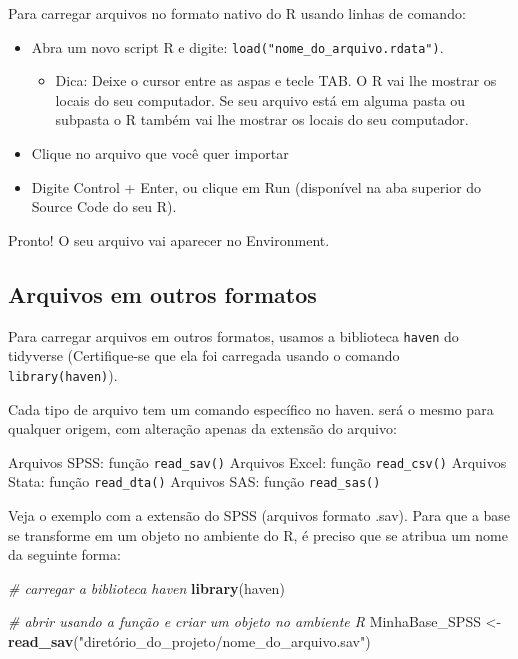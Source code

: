 \documentclass[
  brazil,
]{book}
\newenvironment{Shaded}{\begin{snugshade}}{\end{snugshade}}
\newcommand{\CommentTok}[1]{\textcolor[rgb]{0.56,0.35,0.01}{\textit{#1}}}
\newcommand{\KeywordTok}[1]{\textcolor[rgb]{0.13,0.29,0.53}{\textbf{#1}}}
\newcommand{\NormalTok}[1]{#1}
\newcommand{\StringTok}[1]{\textcolor[rgb]{0.31,0.60,0.02}{#1}}
\providecommand{\tightlist}{%
  \setlength{\itemsep}{0pt}\setlength{\parskip}{0pt}}
\begin{document}
Para carregar arquivos no formato nativo do R usando linhas de comando:

\begin{itemize}
\tightlist
\item
  Abra um novo script R e digite: \texttt{load("nome\_do\_arquivo.rdata")}.

  \begin{itemize}
  \tightlist
  \item
    Dica: Deixe o cursor entre as aspas e tecle TAB. O R vai lhe mostrar os locais do seu computador. Se seu arquivo está em alguma pasta ou subpasta o R também vai lhe mostrar os locais do seu computador.
  \end{itemize}
\item
  Clique no arquivo que você quer importar
\item
  Digite Control + Enter, ou clique em Run (disponível na aba superior do Source Code do seu R).
\end{itemize}

Pronto! O seu arquivo vai aparecer no Environment.

\hypertarget{arquivos-em-outros-formatos-1}{%
\subsection{Arquivos em outros formatos}\label{arquivos-em-outros-formatos-1}}

Para carregar arquivos em outros formatos, usamos a biblioteca \texttt{haven} do tidyverse (Certifique-se que ela foi carregada usando o comando \texttt{library(haven)}).

Cada tipo de arquivo tem um comando específico no haven. será o mesmo para qualquer origem, com alteração apenas da extensão do arquivo:

Arquivos SPSS: função \texttt{read\_sav()}
Arquivos Excel: função \texttt{read\_csv()}
Arquivos Stata: função \texttt{read\_dta()}
Arquivos SAS: função \texttt{read\_sas()}

Veja o exemplo com a extensão do SPSS (arquivos formato .sav). Para que a base se transforme em um objeto no ambiente do R, é preciso que se atribua um nome da seguinte forma:

\begin{Shaded}
\begin{Highlighting}[]
\CommentTok{# carregar a biblioteca haven}
\KeywordTok{library}\NormalTok{(haven)}

\CommentTok{# abrir usando a função e criar um objeto no ambiente R}
\NormalTok{MinhaBase_SPSS <-}\StringTok{ }\KeywordTok{read_sav}\NormalTok{(}\StringTok{"diretório_do_projeto/nome_do_arquivo.sav"}\NormalTok{)}
\end{Highlighting}
\end{Shaded}
\end{document}
